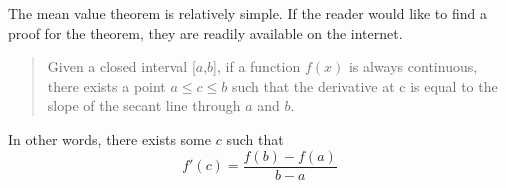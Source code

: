 \documentclass[../revisedmain.tex]{subfiles}
\begin{document}
	The mean value theorem is relatively simple. If the reader would like to find a proof for the theorem, they are readily available on the internet.
	\begin{quotation}
		Given a closed interval [$a$,$b$], if a function $f(x)$ is always continuous, there exists a point $a\leq c\leq b$ such that the derivative at c is equal to the slope of the secant line through $a$ and $b$.
	\end{quotation}
	In other words, there exists some $c$ such that $$f'(c)=\frac{f(b)-f(a)}{b-a}$$
\end{document}
